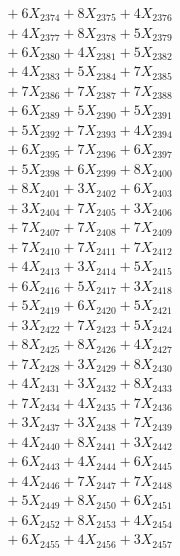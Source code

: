 \documentclass[a4paper,10pt]{article}
\begin{document}
{\begin{align}
&\;  + 6 X_{2374} + 8 X_{2375} + 4 X_{2376} \\[0.3ex]
&\;  + 4 X_{2377} + 8 X_{2378} + 5 X_{2379} \\[0.5ex]\allowbreak
&\;  + 6 X_{2380} + 4 X_{2381} + 5 X_{2382} \\[0.3ex]
&\;  + 4 X_{2383} + 5 X_{2384} + 7 X_{2385} \\[0.3ex]
&\;  + 7 X_{2386} + 7 X_{2387} + 7 X_{2388} \\[0.3ex]
&\;  + 6 X_{2389} + 5 X_{2390} + 5 X_{2391} \\[0.3ex]
&\;  + 5 X_{2392} + 7 X_{2393} + 4 X_{2394} \\[0.3ex]
&\;  + 6 X_{2395} + 7 X_{2396} + 6 X_{2397} \\[0.3ex]
&\;  + 5 X_{2398} + 6 X_{2399} + 8 X_{2400} \\[0.3ex]
&\;  + 8 X_{2401} + 3 X_{2402} + 6 X_{2403} \\[0.3ex]
&\;  + 3 X_{2404} + 7 X_{2405} + 3 X_{2406} \\[0.3ex]
&\;  + 7 X_{2407} + 7 X_{2408} + 7 X_{2409} \\[0.5ex]\allowbreak
&\;  + 7 X_{2410} + 7 X_{2411} + 7 X_{2412} \\[0.3ex]
&\;  + 4 X_{2413} + 3 X_{2414} + 5 X_{2415} \\[0.3ex]
&\;  + 6 X_{2416} + 5 X_{2417} + 3 X_{2418} \\[0.3ex]
&\;  + 5 X_{2419} + 6 X_{2420} + 5 X_{2421} \\[0.3ex]
&\;  + 3 X_{2422} + 7 X_{2423} + 5 X_{2424} \\[0.3ex]
&\;  + 8 X_{2425} + 8 X_{2426} + 4 X_{2427} \\[0.3ex]
&\;  + 7 X_{2428} + 3 X_{2429} + 8 X_{2430} \\[0.3ex]
&\;  + 4 X_{2431} + 3 X_{2432} + 8 X_{2433} \\[0.3ex]
&\;  + 7 X_{2434} + 4 X_{2435} + 7 X_{2436} \\[0.3ex]
&\;  + 3 X_{2437} + 3 X_{2438} + 7 X_{2439} \\[0.5ex]\allowbreak
&\;  + 4 X_{2440} + 8 X_{2441} + 3 X_{2442} \\[0.3ex]
&\;  + 6 X_{2443} + 4 X_{2444} + 6 X_{2445} \\[0.3ex]
&\;  + 4 X_{2446} + 7 X_{2447} + 7 X_{2448} \\[0.3ex]
&\;  + 5 X_{2449} + 8 X_{2450} + 6 X_{2451} \\[0.3ex]
&\;  + 6 X_{2452} + 8 X_{2453} + 4 X_{2454} \\[0.3ex]
&\;  + 6 X_{2455} + 4 X_{2456} + 3 X_{2457} \\[0.3ex]

\end{align}}
\end{document}
